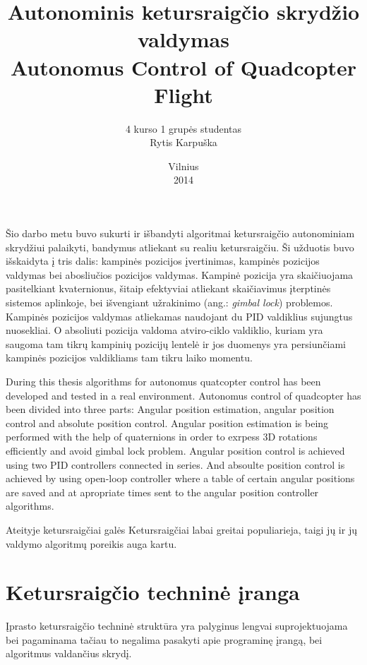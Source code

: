 \documentclass[12pt, a4paper, lithuanian, final]{article}
\title{Autonominis ketursraigčio skrydžio valdymas\\Autonomus Control of Quadcopter Flight}
\author{
    4 kurso 1 grupės studentas \\
    Rytis Karpuška
}
\date{Vilnius \\
	2014}
\begin{document}
\maketitle

Šio darbo metu buvo sukurti ir išbandyti algoritmai ketursraigčio autonominiam skrydžiui palaikyti, bandymus atliekant su realiu ketursraigčiu.
Ši užduotis buvo išskaidyta į tris dalis: kampinės pozicijos įvertinimas, kampinės pozicijos valdymas bei abosliučios pozicijos valdymas.
Kampinė pozicija yra skaičiuojama pasitelkiant kvaternionus, šitaip efektyviai atliekant skaičiavimus įterptinės sistemos aplinkoje, bei išvengiant užrakinimo (ang.: \textit{gimbal lock}) problemos.
Kampinės pozicijos valdymas atliekamas naudojant du PID valdiklius sujungtus nuosekliai.
O absoliuti pozicija valdoma atviro-ciklo valdiklio, kuriam yra saugoma tam tikrų kampinių pozicijų lentelė ir jos duomenys yra persiunčiami kampinės pozicijos valdikliams tam tikru laiko momentu.



During this thesis algorithms for autonomus quatcopter control has been developed and tested in a real environment.
Autonomus control of quadcopter has been divided into three parts: Angular position estimation, angular position control and absolute position control.
Angular position estimation is being performed with the help of quaternions in order to exrpess 3D rotations efficiently and avoid gimbal lock problem.
Angular position control is achieved using two PID controllers connected in series.
And absoulte position control is achieved by using open-loop controller where a table of certain angular positions are saved and at apropriate times sent to the angular position controller algorithms.



\newpage
\tableofcontents




Ateityje ketursraigčiai galės 
Ketursraigčiai labai greitai populiarieja, taigi jų ir jų valdymo algoritmų poreikis auga kartu.




\section{Ketursraigčio techninė įranga}
Įprasto ketursraigčio techninė struktūra yra palyginus lengvai suprojektuojama bei pagaminama tačiau to negalima pasakyti apie programinę įrangą, bei algoritmus valdančius skrydį.
\end{document}
